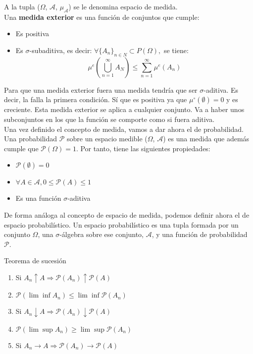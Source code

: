 A la tupla ($\Omega$, $\mathcal{A}$, $\mu_{\mathcal{A}}$) se le denomina espacio de medida.\\

Una \textbf{medida exterior} es una función de conjuntos que cumple:
\begin{itemize}
	\item Es positiva
	\item Es $\sigma$-subaditiva, es decir: $\forall \{A_n\}_{n\in N} \subset P(\Omega),$ se tiene:
	\[
	 \mu^e(\bigcup_{n=1}^\infty A_N) \leq \sum_{n=1}^\infty \mu^e(A_n)
	\]
\end{itemize} 

Para que una medida exterior fuera una medida tendría que ser $\sigma$-aditiva. Es decir, la falla la primera condición. Sí que es positiva ya que $\mu^\circ(\emptyset)=0$ y es creciente. Esta medida exterior se aplica a cualquier conjunto. Va a haber unos subconjuntos en los que la función se comporte como si fuera aditiva.\\

Una vez definido el concepto de medida, vamos a dar ahora el de probabilidad. Una probabilidad $\mathcal{P}$ sobre un espacio medible ($\Omega$, $\mathcal{A}$) es una medida que además cumple que $\mathcal{P}(\Omega)=1$. Por tanto, tiene las siguientes propiedades:\\

\begin{itemize}
	\item $\mathcal{P}(\emptyset)=0$
	\item $\forall A \in \mathcal{A}, 0 \leq \mathcal{P}(A) \leq 1$
	\item Es una función $\sigma$-aditiva
\end{itemize}

De forma análoga al concepto de espacio de medida, podemos definir ahora el de espacio probabilístico. Un espacio probabilístico es una tupla formada por un conjunto $\Omega$, una $\sigma$-álgebra sobre ese conjunto, $\mathcal{A}$, y una función de probabilidad $\mathcal{P}$.

\begin{theorem}
Teorema de sucesión
\begin{enumerate}
\item Si $A_n \uparrow A \Rightarrow \mathcal{P} (A_n) \uparrow \mathcal{P}(A)$
\item $\mathcal{P}(\lim \inf A_n) \leq \lim \inf \mathcal{P}(A_n)$
\item Si $A_n \downarrow A \Rightarrow \mathcal{P} (A_n) \downarrow \mathcal{P}(A)$
\item $\mathcal{P}(\lim \sup A_n) \geq \lim \sup \mathcal{P}(A_n)$
\item Si $A_n \rightarrow A \Rightarrow \mathcal{P} (A_n) \rightarrow \mathcal{P}(A)$
\end{enumerate}
\end{theorem}

